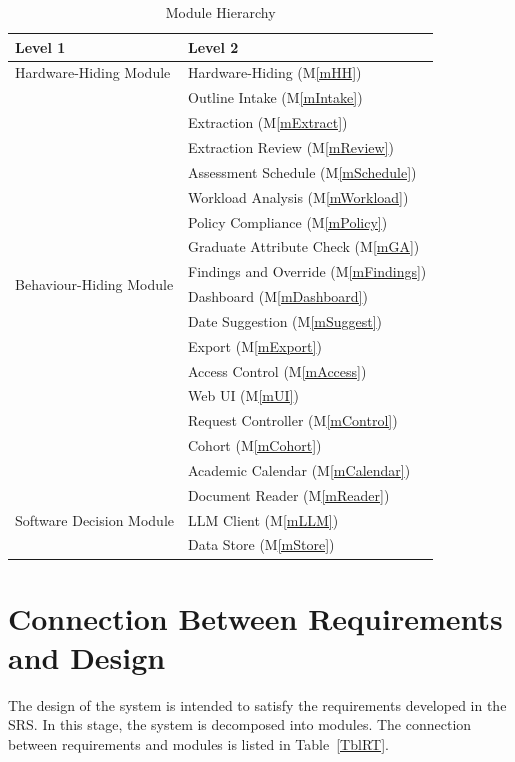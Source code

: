 \documentclass[12pt, titlepage]{article}
\newcommand{\mref}[1]{M\ref{#1}}
\begin{document}
\begin{table}[h!]
\centering
\begin{tabular}{p{} p{}}
\toprule
\textbf{Level 1} & \textbf{Level 2}\\
\midrule

{Hardware-Hiding Module} & Hardware-Hiding (\mref{mHH})\\
\midrule

\multirow{16}{0.3\textwidth}{Behaviour-Hiding Module}
& Outline Intake (\mref{mIntake})\\
& Extraction (\mref{mExtract})\\
& Extraction Review (\mref{mReview})\\
& Assessment Schedule (\mref{mSchedule})\\
& Workload Analysis (\mref{mWorkload})\\
& Policy Compliance (\mref{mPolicy})\\
& Graduate Attribute Check (\mref{mGA})\\
& Findings and Override (\mref{mFindings})\\
& Dashboard (\mref{mDashboard})\\
& Date Suggestion (\mref{mSuggest})\\
& Export (\mref{mExport})\\
& Access Control (\mref{mAccess})\\
& Web UI (\mref{mUI})\\
& Request Controller (\mref{mControl})\\
& Cohort (\mref{mCohort})\\
& Academic Calendar (\mref{mCalendar})\\
\midrule

\multirow{3}{0.3\textwidth}{Software Decision Module}
& Document Reader (\mref{mReader})\\
& LLM Client (\mref{mLLM})\\
& Data Store (\mref{mStore})\\
\bottomrule

\end{tabular}
\caption{Module Hierarchy}
\label{TblMH}
\end{table}


\section{Connection Between Requirements and Design} \label{SecConnection}

The design of the system is intended to satisfy the requirements developed in
the SRS. In this stage, the system is decomposed into modules. The connection
between requirements and modules is listed in Table~\ref{TblRT}.
\end{document}
